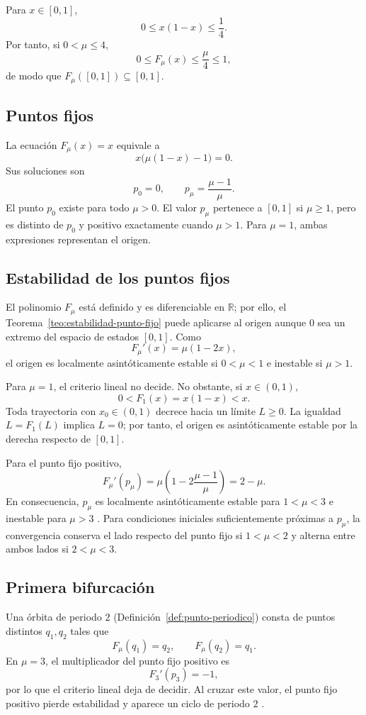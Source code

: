 \documentclass[11pt,letterpaper]{article}
\theoremstyle{definition}
\theoremstyle{remark}
\begin{document}
Para \(x\in[0,1]\),
\[
0\leq x(1-x)\leq\frac14.
\]
Por tanto, si \(0<\mu\leq4\),
\[
0\leq F_\mu(x)\leq\frac{\mu}{4}\leq1,
\]
de modo que \(F_\mu([0,1])\subseteq[0,1]\).

\subsection{Puntos fijos}

La ecuación \(F_\mu(x)=x\) equivale a
\[
x\bigl(\mu(1-x)-1\bigr)=0.
\]
Sus soluciones son
\[
p_0=0,
\qquad
p_\mu=\frac{\mu-1}{\mu}.
\]
El punto \(p_0\) existe para todo \(\mu>0\). El valor \(p_\mu\) pertenece a \([0,1]\) si \(\mu\geq1\), pero es distinto de \(p_0\) y positivo exactamente cuando \(\mu>1\). Para \(\mu=1\), ambas expresiones representan el origen.

\subsection{Estabilidad de los puntos fijos}

El polinomio \(F_\mu\) está definido y es diferenciable en \(\mathbb R\); por ello, el Teorema~\ref{teo:estabilidad-punto-fijo} puede aplicarse al origen aunque \(0\) sea un extremo del espacio de estados \([0,1]\). Como
\[
F_\mu'(x)=\mu(1-2x),
\]
el origen es localmente asintóticamente estable si \(0<\mu<1\) e inestable si \(\mu>1\).

Para \(\mu=1\), el criterio lineal no decide. No obstante, si \(x\in(0,1)\),
\[
0<F_1(x)=x(1-x)<x.
\]
Toda trayectoria con \(x_0\in(0,1)\) decrece hacia un límite \(L\geq0\). La igualdad \(L=F_1(L)\) implica \(L=0\); por tanto, el origen es asintóticamente estable por la derecha respecto de \([0,1]\).

Para el punto fijo positivo,
\[
F_\mu'(p_\mu)
=\mu\left(1-2\frac{\mu-1}{\mu}\right)
=2-\mu.
\]
En consecuencia, \(p_\mu\) es localmente asintóticamente estable para \(1<\mu<3\) e inestable para \(\mu>3\) \cite{HirschSmaleDevaney2013,Devaney1989}. Para condiciones iniciales suficientemente próximas a \(p_\mu\), la convergencia conserva el lado respecto del punto fijo si \(1<\mu<2\) y alterna entre ambos lados si \(2<\mu<3\).

\subsection{Primera bifurcación}

Una órbita de periodo \(2\) (Definición~\ref{def:punto-periodico}) consta de puntos distintos \(q_1,q_2\) tales que
\[
F_\mu(q_1)=q_2,
\qquad
F_\mu(q_2)=q_1.
\]
En \(\mu=3\), el multiplicador del punto fijo positivo es
\[
F_3'(p_3)=-1,
\]
por lo que el criterio lineal deja de decidir. Al cruzar este valor, el punto fijo positivo pierde estabilidad y aparece un ciclo de periodo \(2\) \cite{Devaney1989,HirschSmaleDevaney2013}.
\end{document}
